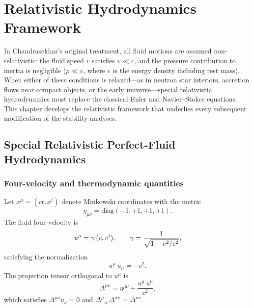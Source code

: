 
\chapter{Relativistic Hydrodynamics Framework}
\label{ch:rel-framework}

In Chandrasekhar's original treatment, all fluid motions are assumed
non-relativistic: the fluid speed $v$ satisfies $v \ll c$, and the
pressure contribution to inertia is negligible ($p \ll \varepsilon$,
where $\varepsilon$ is the energy density including rest mass).  When
either of these conditions is relaxed---as in neutron star interiors,
accretion flows near compact objects, or the early universe---special
relativistic hydrodynamics must replace the classical Euler and
Navier--Stokes equations.  This chapter develops the relativistic
framework that underlies every subsequent modification of the
stability analyses.

\section{Special Relativistic Perfect-Fluid Hydrodynamics}
\label{sec:sr-hydro}

\subsection{Four-velocity and thermodynamic quantities}
\label{sec:four-vel}

Let $x^{\mu} = (ct, x^i)$ denote Minkowski coordinates with the
metric
\begin{equation}
  \eta_{\mu\nu} = \mathrm{diag}(-1,+1,+1,+1).
  \label{eq:rel-metric}
\end{equation}
The fluid four-velocity is
\begin{equation}
  u^{\mu} = \gamma\,(c, v^i),
  \qquad
  \gamma = \frac{1}{\sqrt{1 - v^2/c^2}},
  \label{eq:rel-four-vel}
\end{equation}
satisfying the normalization
\begin{equation}
  u^{\mu}\, u_{\mu} = -c^2.
  \label{eq:rel-norm}
\end{equation}
The projection tensor orthogonal to $u^{\mu}$ is
\begin{equation}
  \Delta^{\mu\nu} = \eta^{\mu\nu} + \frac{u^{\mu}\, u^{\nu}}{c^2},
  \label{eq:rel-proj}
\end{equation}
which satisfies $\Delta^{\mu\nu} u_{\nu} = 0$ and
$\Delta^{\mu}{}_{\alpha}\,\Delta^{\alpha\nu} = \Delta^{\mu\nu}$.

